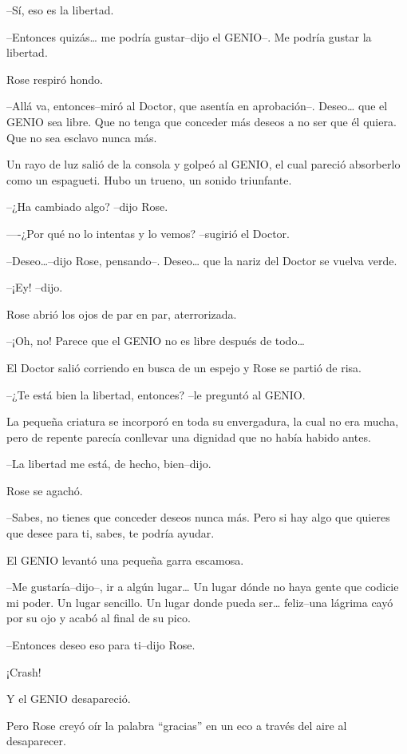 --Sí, eso es la libertad.

--Entonces quizás\ldots{} me podría gustar--dijo el GENIO--. Me podría
gustar la libertad.

Rose respiró hondo.

--Allá va, entonces--miró al Doctor, que asentía en aprobación--.
Deseo\ldots{} que el GENIO sea libre. Que no tenga que conceder más
deseos a no ser que él quiera. Que no sea esclavo nunca más.

Un rayo de luz salió de la consola y golpeó al GENIO, el cual pareció
absorberlo como un espagueti. Hubo un trueno, un sonido triunfante.

--¿Ha cambiado algo? --dijo Rose.

----¿Por qué no lo intentas y lo vemos? --sugirió el Doctor.

--Deseo\ldots{}--dijo Rose, pensando--. Deseo\ldots{} que la nariz del
Doctor se vuelva verde.

--¡Ey! --dijo.

Rose abrió los ojos de par en par, aterrorizada.

--¡Oh, no! Parece que el GENIO no es libre después de todo\ldots{}

El Doctor salió corriendo en busca de un espejo y Rose se partió de
risa.

--¿Te está bien la libertad, entonces? --le preguntó al GENIO.

La pequeña criatura se incorporó en toda su envergadura, la cual no era
mucha, pero de repente parecía conllevar una dignidad que no había
habido antes.

--La libertad me está, de hecho, bien--dijo.

Rose se agachó.

--Sabes, no tienes que conceder deseos nunca más. Pero si hay algo que
quieres que desee para ti, sabes, te podría ayudar.

El GENIO levantó una pequeña garra escamosa.

--Me gustaría--dijo--, ir a algún lugar\ldots{} Un lugar dónde no haya
gente que codicie mi poder. Un lugar sencillo. Un lugar donde pueda
ser\ldots{} feliz--una lágrima cayó por su ojo y acabó al final de su
pico.

--Entonces deseo eso para ti--dijo Rose.

¡Crash!

Y el GENIO desapareció.

Pero Rose creyó oír la palabra ``gracias'' en un eco a través del aire
al desaparecer.

